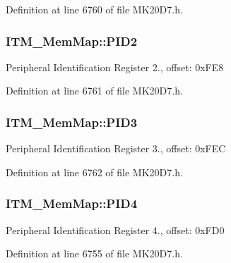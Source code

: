 Definition at line 6760 of file M\+K20\+D7.\+h.

\subsubsection[{\texorpdfstring{P\+I\+D2}{PID2}}]{ I\+T\+M\+\_\+\+Mem\+Map\+::\+P\+I\+D2}\hypertarget{struct_i_t_m___mem_map_a3741dc3de5146a9df958acae0b2e0ea0}{}\label{struct_i_t_m___mem_map_a3741dc3de5146a9df958acae0b2e0ea0}
Peripheral Identification Register 2., offset\+: 0x\+F\+E8 

Definition at line 6761 of file M\+K20\+D7.\+h.

\subsubsection[{\texorpdfstring{P\+I\+D3}{PID3}}]{ I\+T\+M\+\_\+\+Mem\+Map\+::\+P\+I\+D3}\hypertarget{struct_i_t_m___mem_map_a224feb863e1cd18dcb71e8da810f9d61}{}\label{struct_i_t_m___mem_map_a224feb863e1cd18dcb71e8da810f9d61}
Peripheral Identification Register 3., offset\+: 0x\+F\+EC 

Definition at line 6762 of file M\+K20\+D7.\+h.

\subsubsection[{\texorpdfstring{P\+I\+D4}{PID4}}]{ I\+T\+M\+\_\+\+Mem\+Map\+::\+P\+I\+D4}\hypertarget{struct_i_t_m___mem_map_ab25032ed174621fec16ce7f0b797e251}{}\label{struct_i_t_m___mem_map_ab25032ed174621fec16ce7f0b797e251}
Peripheral Identification Register 4., offset\+: 0x\+F\+D0 

Definition at line 6755 of file M\+K20\+D7.\+h.

